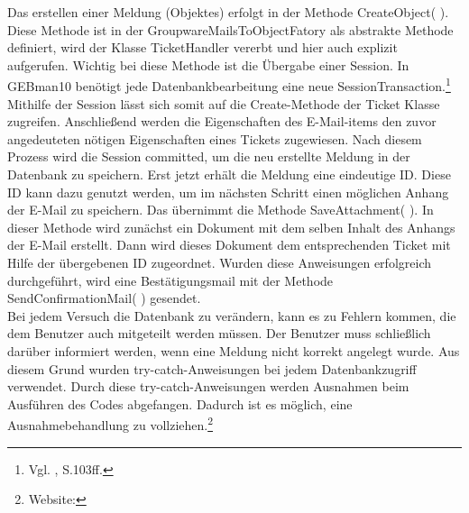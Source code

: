 \noindent
Das erstellen einer Meldung (Objektes) erfolgt in der Methode CreateObject( ). Diese Methode ist in der GroupwareMailsToObjectFatory als abstrakte Methode definiert, wird der Klasse TicketHandler vererbt und hier auch explizit aufgerufen. Wichtig bei diese Methode ist die Übergabe einer Session. In GEBman10 benötigt jede Datenbankbearbeitung eine neue SessionTransaction.\footnote{Vgl. \citeauthor{Fowler} \citeyear{Fowler}, S.103ff.} 
Mithilfe der Session lässt sich somit auf die Create-Methode der Ticket Klasse zugreifen. Anschließend werden die Eigenschaften des E-Mail-items den zuvor angedeuteten nötigen Eigenschaften eines Tickets zugewiesen. Nach diesem Prozess wird die Session committed, um die neu erstellte Meldung in der Datenbank zu speichern. Erst jetzt erhält die Meldung eine eindeutige ID. Diese ID kann dazu genutzt werden, um im nächsten Schritt einen möglichen Anhang der E-Mail zu speichern. Das übernimmt die Methode SaveAttachment( ). In dieser Methode wird zunächst ein Dokument mit dem selben Inhalt des Anhangs der E-Mail erstellt. Dann wird dieses Dokument dem entsprechenden Ticket mit Hilfe der übergebenen ID zugeordnet. Wurden diese Anweisungen erfolgreich durchgeführt, wird eine Bestätigungsmail mit der Methode SendConfirmationMail( ) gesendet.\\

\noindent
Bei jedem Versuch die Datenbank zu verändern, kann es zu Fehlern kommen, die dem Benutzer auch mitgeteilt werden müssen. Der Benutzer muss schließlich darüber informiert werden, wenn eine Meldung nicht korrekt angelegt wurde. Aus diesem Grund wurden try-catch-Anweisungen bei jedem Datenbankzugriff verwendet. Durch diese try-catch-Anweisungen werden Ausnahmen beim Ausführen des Codes abgefangen. Dadurch ist es möglich, eine Ausnahmebehandlung zu vollziehen.\footnote{Website:\cite{TryCatch}}\\


